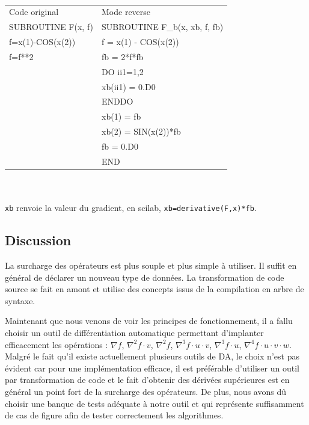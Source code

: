 {\tt
\begin{tabular}{|l|l|}
  \hline
  Code original & Mode reverse \\
  SUBROUTINE F(x, f) & SUBROUTINE F\_b(x, xb, f, fb) \\
  \hline


     f=x(1)-COS(x(2))   &  f = x(1) - COS(x(2)) \\
     f=f**2	          &  fb = 2*f*fb \\
			  &  DO ii1=1,2 \\
			  &    xb(ii1) = 0.D0 \\
			  &  ENDDO \\
			  &  xb(1) = fb \\
			  &  xb(2) = SIN(x(2))*fb \\
			  &  fb = 0.D0 \\
			  &  END \\
  \hline
\end{tabular}
} \\
\vspace{0.5cm}
\\{\tt xb} renvoie la valeur du gradient, en scilab, {\tt xb=derivative(F,x)*fb}.



\subsection{Discussion}

La surcharge des op\'erateurs est plus souple et plus simple \`a utiliser. Il suffit en g\'en\'eral de 
d\'eclarer un nouveau type de donn\'ees.
La transformation de code source se fait en amont et utilise 
des concepts issus de la compilation en arbre de syntaxe. 


Maintenant que nous venons de voir les principes de fonctionnement, il a fallu
choisir un outil de diff\'erentiation automatique permettant d'implanter 
efficacement les op\'erations : $\nabla f$, $\nabla^2 f\cdot v$, $\nabla^2 f$, $\nabla^3 f\cdot u\cdot v$, $\nabla^3 f\cdot u$, 
$\nabla^4 f\cdot u\cdot v\cdot w$. Malgr\'e le fait 
qu'il existe actuellement plusieurs outils de DA, le choix n'est pas \'evident car pour une 
impl\'ementation efficace, il est pr\'ef\'erable d'utiliser un outil par transformation de code et 
le fait d'obtenir des d\'eriv\'ees sup\'erieures est en g\'en\'eral un point fort de la surcharge des 
op\'erateurs.
De plus, nous avons dû choisir une banque de tests ad\'equate \`a notre outil et qui repr\'esente 
suffisamment de cas de figure afin de tester correctement les algorithmes.

